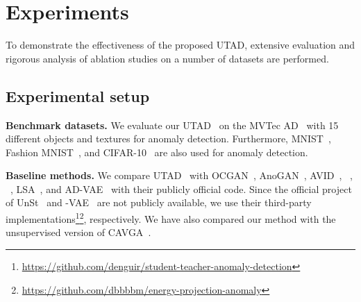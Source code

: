 \documentclass[final]{cvpr}
\newcommand{\proposed}{UTAD}
\begin{document}
\section{Experiments}

To demonstrate the effectiveness of the proposed \proposed, extensive evaluation and rigorous analysis of ablation studies on a number of datasets are performed.

\subsection{Experimental setup}

\noindent\textbf{Benchmark datasets.}
We evaluate our \proposed~ on the MVTec AD~\cite{A:bergmann2019mvtec} with 15 different objects and textures for anomaly detection. Furthermore, MNIST~\cite{B:lecun1998MNIST}, Fashion MNIST~\cite{B:xiao2017FashionMNIST}, and CIFAR-10~\cite{B:krizhevsky2009CIFAR10} are also used for anomaly detection.

\noindent\textbf{Baseline methods.}
We compare \proposed~ with OCGAN~\cite{A:perera2019ocgan},  AnoGAN~\cite{A:schlegl2017unsupervised},  AVID~\cite{A:sabokrou2018avid}, ~\cite{A:bergmann2018improving},  ~\cite{A:bergmann2018improving}, LSA~\cite{A:abati2019LSA}, and AD-VAE~\cite{A:liu2020towards} with their publicly official code. Since the official project of UnSt~\cite{A:bergmann2020uninformed} and -VAE~\cite{A:dehaene2020iterative} are not publicly available, we use their third-party implementations\footnote{\scriptsize{\url{https://github.com/denguir/student-teacher-anomaly-detection}}}\footnote{\scriptsize{\url{https://github.com/dbbbbm/energy-projection-anomaly}}}, respectively. We have also compared our method with the unsupervised version of CAVGA~\cite{A:venkataramanan2020attention}.
\end{document}
